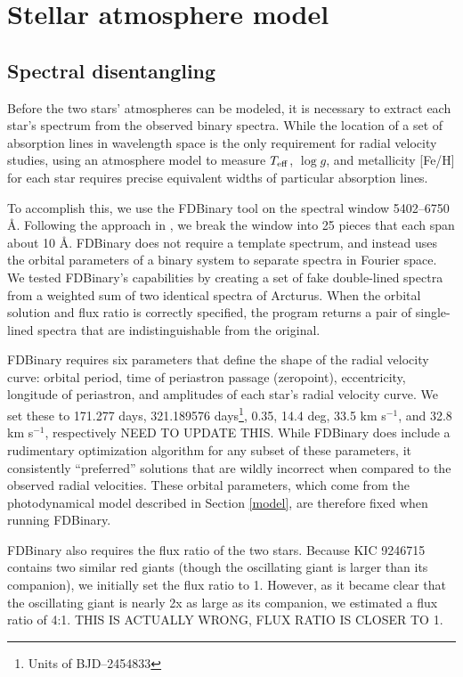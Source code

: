 \section{Stellar atmosphere model}\label{atm}

\subsection{Spectral disentangling}\label{disentangle}
Before the two stars' atmospheres can be modeled, it is necessary to extract each star's spectrum from the observed binary spectra. While the location of a set of absorption lines in wavelength space is the only requirement for radial velocity studies, using an atmosphere model to measure $T_{\rm{eff}}$, $\log g$, and metallicity [Fe/H] for each star requires precise equivalent widths of particular absorption lines.

To accomplish this, we use the FDBinary tool \citep{ili04} on the spectral window 5402--6750 \AA. Following the approach in \citet{bec14}, we break the window into 25 pieces that each span about 10 \AA. FDBinary does not require a template spectrum, and instead uses the orbital parameters of a binary system to separate spectra in Fourier space. We tested FDBinary's capabilities by creating a set of fake double-lined spectra from a weighted sum of two identical spectra of Arcturus. When the orbital solution and flux ratio is correctly specified, the program returns a pair of single-lined spectra that are indistinguishable from the original.

FDBinary requires six parameters that define the shape of the radial velocity curve: orbital period, time of periastron passage (zeropoint), eccentricity, longitude of periastron, and amplitudes of each star's radial velocity curve. We set these to 171.277 days, 321.189576 days\footnote{Units of BJD--2454833}, 0.35, 14.4 deg, 33.5 km s$^{-1}$, and 32.8 km s$^{-1}$, respectively NEED TO UPDATE THIS. While FDBinary does include a rudimentary optimization algorithm for any subset of these parameters, it consistently ``preferred'' solutions that are wildly incorrect when compared to the observed radial velocities. These orbital parameters, which come from the photodynamical model described in Section \ref{model}, are therefore fixed when running FDBinary.

FDBinary also requires the flux ratio of the two stars. Because KIC 9246715 contains two similar red giants (though the oscillating giant is larger than its companion), we initially set the flux ratio to 1. However, as it became clear that the oscillating giant is nearly 2x as large as its companion, we estimated a flux ratio of 4:1. THIS IS ACTUALLY WRONG, FLUX RATIO IS CLOSER TO 1.

